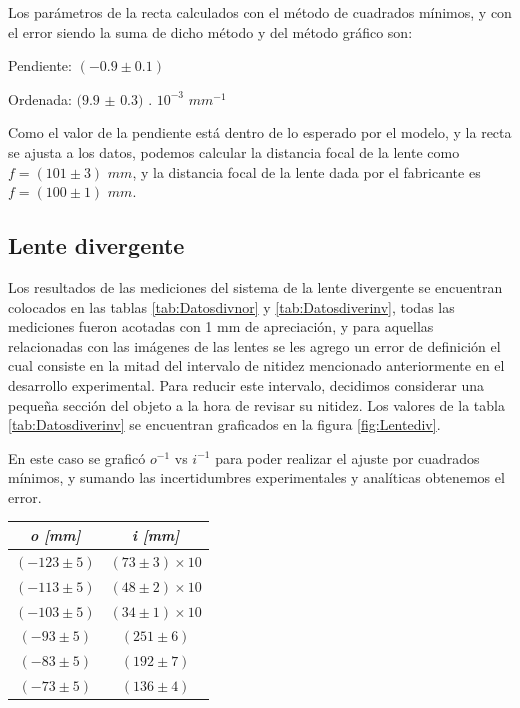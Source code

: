 \documentclass[a4paper,12pt]{article}
\newenvironment{Figure}
  {\par\medskip\noindent\minipage{\linewidth}}
  {\endminipage\par\medskip}
\begin{document}
\begin{multicols*}{2}
        Los parámetros de la recta calculados con el método de cuadrados mínimos, y con el error siendo la suma de dicho método y del método gráfico son:

        Pendiente: $(-0.9 \pm 0.1)$

        Ordenada: $(9.9$ $\pm$ $0.3)$ . $10^{-3}$ $mm^{-1}$

        Como el valor de la pendiente está dentro de lo esperado por el modelo, y la recta se ajusta a los datos, podemos calcular la distancia focal de la lente como $f = (101 \pm 3)$ $mm$, y la distancia focal de la lente dada por el fabricante es $f = (100 \pm 1)$ $mm$.

    \subsection*{Lente divergente}

        Los resultados de las mediciones del sistema de la lente divergente se encuentran colocados en las tablas \ref{tab:Datosdivnor} y \ref{tab:Datosdiverinv}, todas las mediciones fueron acotadas con 1 mm de apreciación, y para aquellas relacionadas con las imágenes de las lentes se les agrego un error de definición el cual consiste en la mitad del intervalo de nitidez mencionado anteriormente en el desarrollo experimental. Para reducir este intervalo, decidimos considerar una pequeña sección del objeto a la hora de revisar su nitidez. Los valores de la tabla \ref{tab:Datosdiverinv} se encuentran graficados en la figura \ref{fig:Lentediv}.

        En este caso se graficó $o^{-1}$ vs $i^{-1}$ para poder realizar el ajuste por cuadrados mínimos, y sumando las incertidumbres experimentales y analíticas obtenemos el error.

        \begin{Figure}
            \centering

            \begin{tabular}{cc}
                \toprule
                \multicolumn{1}{c}{\textit{\textbf{o} [mm]}} & \textit{\textbf{i} [mm]} \\
                \midrule
                $(-123 \pm 5)$ & $(73 \pm 3)\times10 $\\
                $(-113 \pm 5)$ & $(48 \pm 2)\times10$ \\
                $(-103 \pm 5)$ & $(34 \pm 1)\times10$ \\
                $(-93 \pm 5)$ & $(251 \pm 6)$ \\
                $(-83 \pm 5)$& $(192 \pm 7)$ \\
                $(-73 \pm 5)$ & $(136 \pm 4)$ \\
                \bottomrule
            \end{tabular}


\end{Figure}
\end{multicols*}
\end{document}
